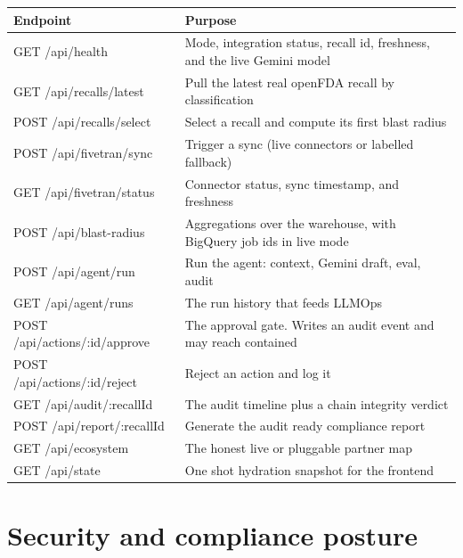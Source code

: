 \documentclass[11pt]{article}
\newcommand{\code}[1]{{\ttfamily\small #1}}
\begin{document}
\begin{center}
\renewcommand{\arraystretch}{1.25}
\begin{tabularx}{\textwidth}{@{}l X@{}}
\toprule
Endpoint & Purpose \\
\midrule
\code{GET /api/health} & Mode, integration status, recall id, freshness, and the live Gemini model \\
\code{GET /api/recalls/latest} & Pull the latest real openFDA recall by classification \\
\code{POST /api/recalls/select} & Select a recall and compute its first blast radius \\
\code{POST /api/fivetran/sync} & Trigger a sync (live connectors or labelled fallback) \\
\code{GET /api/fivetran/status} & Connector status, sync timestamp, and freshness \\
\code{POST /api/blast-radius} & Aggregations over the warehouse, with BigQuery job ids in live mode \\
\code{POST /api/agent/run} & Run the agent: context, Gemini draft, eval, audit \\
\code{GET /api/agent/runs} & The run history that feeds LLMOps \\
\code{POST /api/actions/:id/approve} & The approval gate. Writes an audit event and may reach contained \\
\code{POST /api/actions/:id/reject} & Reject an action and log it \\
\code{GET /api/audit/:recallId} & The audit timeline plus a chain integrity verdict \\
\code{POST /api/report/:recallId} & Generate the audit ready compliance report \\
\code{GET /api/ecosystem} & The honest live or pluggable partner map \\
\code{GET /api/state} & One shot hydration snapshot for the frontend \\
\bottomrule
\end{tabularx}
\end{center}

\section{Security and compliance posture}
\end{document}
